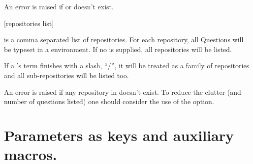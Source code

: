 \documentclass[10pt]{article}
\begin{document}
\begin{tsremark}
An error is raised if  or  doesn't exist.
\end{tsremark}

%

\begin{codedescribe}{\QuestionsList}\label{quest list}
\begin{codesyntax}%
\tsmacro{\QuestionsList}[repositories list]{}
\end{codesyntax}
 is a comma separated list of repositories. For each repository,  all Questions will be typeset in a  environment. If no  is supplied, all repositories will be listed.
\end{codedescribe}

\begin{tsremark}
If a 's term finishes with a slash, ``/'', it will be treated as a family of repositories and all sub-repositories will be listed too.
\end{tsremark}

\begin{tsremark}
An error is raised if any repository in  doesn't exist. To reduce the clutter (and number of questions listed) one should consider the use of the   option.
\end{tsremark}

\section{Parameters as keys and auxiliary macros.}\label{parameters}
\end{document}
